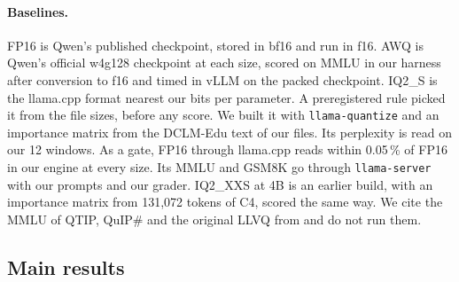 \paragraph{Baselines.} FP16 is Qwen's published checkpoint, stored in bf16 and
run in f16. AWQ is Qwen's official w4g128 checkpoint at each size, scored on
MMLU in our harness after conversion to f16 and timed in vLLM on the packed
checkpoint. IQ2\_S is the llama.cpp format nearest our bits per parameter. A
preregistered rule picked it from the file sizes, before any score. We built
it with \texttt{llama-quantize} and an importance matrix from the DCLM-Edu
text of our files. Its perplexity is read on our 12 windows. As a gate, FP16
through llama.cpp reads within 0.05\,\% of FP16 in our engine at every size.
Its MMLU and GSM8K go through \texttt{llama-server} with our prompts and our
grader. IQ2\_XXS at 4B is an earlier build, with an importance matrix from
131{,}072 tokens of C4, scored the same way. We cite the
MMLU of QTIP, QuIP\# and the original LLVQ from \citet{llvq2026} and do not
run them.

\subsection{Main results}
\label{sec:main}

